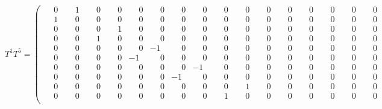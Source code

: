 \documentclass[10pt]{article}
\begin{document}
\[
T^{1}T^{5} = \left(\begin{smallmatrix}
\phantom{-}0 & \phantom{-}1 & \phantom{-}0 & \phantom{-}0 & \phantom{-}0 & \phantom{-}0 & \phantom{-}0 & \phantom{-}0 & \phantom{-}0 & \phantom{-}0 & \phantom{-}0 & \phantom{-}0 & \phantom{-}0 & \phantom{-}0 & \phantom{-}0 & \phantom{-}0 \\
\phantom{-}1 & \phantom{-}0 & \phantom{-}0 & \phantom{-}0 & \phantom{-}0 & \phantom{-}0 & \phantom{-}0 & \phantom{-}0 & \phantom{-}0 & \phantom{-}0 & \phantom{-}0 & \phantom{-}0 & \phantom{-}0 & \phantom{-}0 & \phantom{-}0 & \phantom{-}0 \\
\phantom{-}0 & \phantom{-}0 & \phantom{-}0 & \phantom{-}1 & \phantom{-}0 & \phantom{-}0 & \phantom{-}0 & \phantom{-}0 & \phantom{-}0 & \phantom{-}0 & \phantom{-}0 & \phantom{-}0 & \phantom{-}0 & \phantom{-}0 & \phantom{-}0 & \phantom{-}0 \\
\phantom{-}0 & \phantom{-}0 & \phantom{-}1 & \phantom{-}0 & \phantom{-}0 & \phantom{-}0 & \phantom{-}0 & \phantom{-}0 & \phantom{-}0 & \phantom{-}0 & \phantom{-}0 & \phantom{-}0 & \phantom{-}0 & \phantom{-}0 & \phantom{-}0 & \phantom{-}0 \\
\phantom{-}0 & \phantom{-}0 & \phantom{-}0 & \phantom{-}0 & \phantom{-}0 & -1 & \phantom{-}0 & \phantom{-}0 & \phantom{-}0 & \phantom{-}0 & \phantom{-}0 & \phantom{-}0 & \phantom{-}0 & \phantom{-}0 & \phantom{-}0 & \phantom{-}0 \\
\phantom{-}0 & \phantom{-}0 & \phantom{-}0 & \phantom{-}0 & -1 & \phantom{-}0 & \phantom{-}0 & \phantom{-}0 & \phantom{-}0 & \phantom{-}0 & \phantom{-}0 & \phantom{-}0 & \phantom{-}0 & \phantom{-}0 & \phantom{-}0 & \phantom{-}0 \\
\phantom{-}0 & \phantom{-}0 & \phantom{-}0 & \phantom{-}0 & \phantom{-}0 & \phantom{-}0 & \phantom{-}0 & -1 & \phantom{-}0 & \phantom{-}0 & \phantom{-}0 & \phantom{-}0 & \phantom{-}0 & \phantom{-}0 & \phantom{-}0 & \phantom{-}0 \\
\phantom{-}0 & \phantom{-}0 & \phantom{-}0 & \phantom{-}0 & \phantom{-}0 & \phantom{-}0 & -1 & \phantom{-}0 & \phantom{-}0 & \phantom{-}0 & \phantom{-}0 & \phantom{-}0 & \phantom{-}0 & \phantom{-}0 & \phantom{-}0 & \phantom{-}0 \\
\phantom{-}0 & \phantom{-}0 & \phantom{-}0 & \phantom{-}0 & \phantom{-}0 & \phantom{-}0 & \phantom{-}0 & \phantom{-}0 & \phantom{-}0 & \phantom{-}1 & \phantom{-}0 & \phantom{-}0 & \phantom{-}0 & \phantom{-}0 & \phantom{-}0 & \phantom{-}0 \\
\phantom{-}0 & \phantom{-}0 & \phantom{-}0 & \phantom{-}0 & \phantom{-}0 & \phantom{-}0 & \phantom{-}0 & \phantom{-}0 & \phantom{-}1 & \phantom{-}0 & \phantom{-}0 & \phantom{-}0 & \phantom{-}0 & \phantom{-}0 & \phantom{-}0 & \phantom{-}0 \\

\end{smallmatrix}\]
\end{document}
